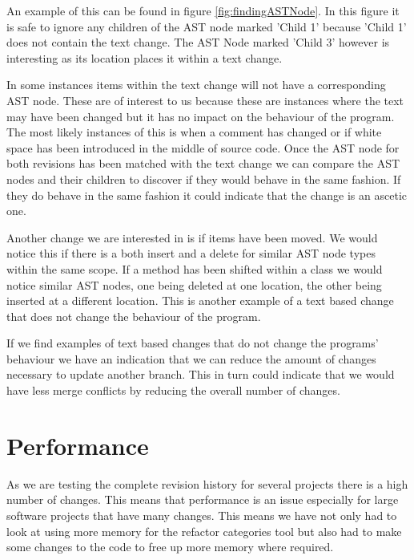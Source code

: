 An example of this can be found in figure \ref{fig:findingASTNode}.  In this figure it is safe to ignore any children of the AST node marked 'Child 1' because 'Child 1' does not contain the text change.  The AST Node marked 'Child 3' however is interesting as its location places it within a text change. 

In some instances items within the text change will not have a corresponding AST node.  These are of interest to us because these are instances where the text may have been changed but it has no impact on the behaviour of the program.  The most likely instances of this is when a comment has changed or if white space has been introduced in the middle of source code. Once the AST node for both revisions has been matched with the text change we can compare the AST nodes and their children to discover if they would behave in the same fashion. If they do behave in the same fashion it could indicate that the change is an ascetic one.

Another change we are interested in is if items have been moved.  We would notice this if there is a both insert and a delete for similar AST node types within the same scope.  If a method has been shifted within a class we would notice similar AST nodes, one being deleted at one location, the other being inserted at a different location.  This is another example of a text based change that does not change the behaviour of the program.


If we find examples of text based changes that do not change the programs' behaviour we have an indication that we can reduce the amount of changes necessary to update another branch. This in turn could indicate that we would have less merge conflicts by reducing the overall number of changes.

\section{Performance}
As we are testing the complete revision history for several projects there is a high number of changes.  This means that performance is an issue especially for large software projects that have many changes. This means we have not only had to look at using more memory for the refactor categories tool but also had to make some changes to the code to free up more memory where required.

